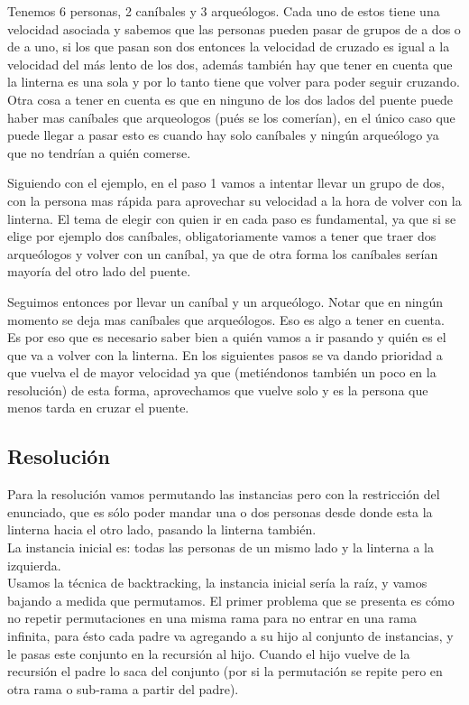 Tenemos 6 personas, 2 caníbales y 3 arqueólogos. Cada uno de estos tiene una velocidad asociada y sabemos que las personas pueden pasar de grupos de a dos o de a uno, si los que pasan son dos entonces la velocidad de cruzado es igual a la velocidad del más lento de los dos, además también hay que tener en cuenta que la linterna es una sola y por lo tanto tiene que volver para poder seguir cruzando. Otra cosa a tener en cuenta es que en ninguno de los dos lados del puente puede haber mas caníbales que arqueologos (pués se los comerían), en el único caso que puede llegar a pasar esto es cuando hay solo caníbales y ningún arqueólogo ya que no tendrían a quién comerse.

Siguiendo con el ejemplo, en el paso 1 vamos a intentar llevar un grupo de dos, con la persona mas rápida para aprovechar su velocidad a la hora de volver con la linterna. El tema de elegir con quien ir en cada paso es fundamental, ya que si se elige por ejemplo dos caníbales, obligatoriamente vamos a tener que traer dos arqueólogos y volver con un caníbal, ya que de otra forma los caníbales serían mayoría del otro lado del puente.

Seguimos entonces por llevar un caníbal y un arqueólogo. Notar que en ningún momento se deja mas caníbales que arqueólogos. Eso es algo a tener en cuenta. Es por eso que es necesario saber bien a quién vamos a ir pasando y quién es el que va a volver con la linterna.
En los siguientes pasos se va dando prioridad a que vuelva el de mayor velocidad ya que (metiéndonos también un poco en la resolución) de esta forma, aprovechamos que vuelve solo y es la persona que menos tarda en cruzar el puente.

\subsection{Resoluci\'on}
Para la resolución vamos permutando las instancias pero con la restricción del enunciado, que es sólo poder mandar una o dos personas desde donde esta la linterna hacia el otro lado, pasando la linterna también.\\
La instancia inicial es: todas las personas de un mismo lado y la linterna a la izquierda. \\
Usamos la técnica de backtracking, la instancia inicial sería la raíz, y vamos bajando a medida que permutamos. El primer problema que se presenta es cómo no repetir permutaciones en una misma rama para no entrar en una rama infinita, para ésto cada padre va agregando a su hijo al conjunto de instancias, y le pasas este conjunto en la recursión al hijo. Cuando el hijo vuelve de la recursión el padre lo saca del conjunto (por si la permutación se repite pero en otra rama o sub-rama a partir del padre).

